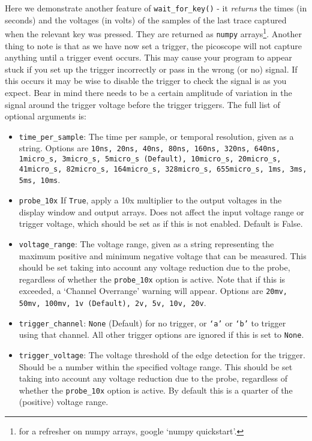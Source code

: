 \documentclass{article}
\begin{document}
Here we demonstrate another feature of \texttt{wait\_for\_key()} - it \textit{returns} the times (in seconds) and the voltages (in volts) of the samples of the last trace captured when the relevant key was pressed. They are returned as \texttt{numpy} arrays\footnote{for a refresher on numpy arrays, google `numpy quickstart'.}. Another thing to note is that as we have now set a trigger, the picoscope will not capture anything until a trigger event occurs. This may cause your program to appear stuck if you set up the trigger incorrectly or pass in the wrong (or no) signal. If this occurs it may be wise to disable the trigger to check the signal is as you expect. Bear in mind there needs to be a certain amplitude of variation in the signal around the trigger voltage before the trigger triggers.
The full list of optional arguments is:
\begin{itemize}



    \item \texttt{time\_per\_sample}: The time per sample, or temporal resolution, given as a string. Options are \texttt{10ns, 20ns, 40ns, 80ns, 160ns, 320ns, 640ns, 1micro\_s, 3micro\_s, 5micro\_s (Default), 10micro\_s, 20micro\_s, 41micro\_s, 
    82micro\_s, 164micro\_s, 328micro\_s, 655micro\_s, 1ms, 3ms, 5ms, 10ms}.
    
    \item \texttt{probe\_10x} If \texttt{True}, apply a 10x multiplier to the output voltages in the display window and output arrays. Does not affect the input voltage range or trigger voltage, which should be set as if this is not enabled. Default is False.
    
    \item \texttt{voltage\_range}: The voltage range, given as a string representing the maximum positive and minimum negative voltage that can be measured. This should be set taking into account any voltage reduction due to the probe, regardless of whether the \texttt{probe\_10x} option is active. Note that if this is exceeded, a `Channel Overrange' warning will appear.
    Options are \texttt{20mv, 50mv, 100mv, 1v (Default), 2v, 5v, 10v, 20v}.
    
    \item \texttt{trigger\_channel}: \texttt{None} (Default) for no trigger, or \texttt{`a'} or \texttt{`b'} to trigger using that channel. All other trigger options are ignored if this is set to \texttt{None}.
    
    \item \texttt{trigger\_voltage}: The voltage threshold of the edge detection for the trigger. Should be a number within the specified voltage range. This should be set taking into account any voltage reduction due to the probe, regardless of whether the \texttt{probe\_10x} option is active. By default this is a quarter of the (positive) voltage range.
    

\end{itemize}
\end{document}
